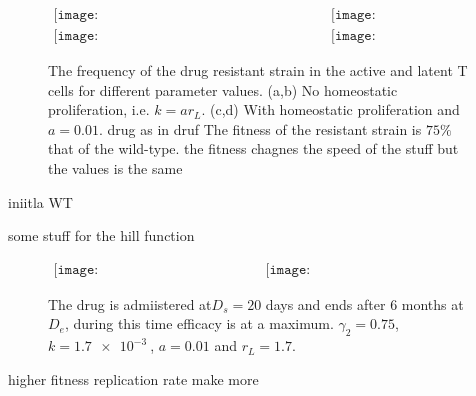 \documentclass[DIV=15]{scrartcl}
\begin{document}
 
 

\begin{figure*}[h]
 \begin{center}$
 \begin{array}{cc}
 \texttt{[image: NoHomeo\_Active\_S1\_HigFit075\_09\_06b.png]} &
 \texttt{[image: NoHomeo\_Reservoir\_S1\_HigFit075\_09\_06b.png]} \\
  \texttt{[image: Homeo\_Active\_S1\_HigFit075\_09\_06b.png]} &
 \texttt{[image: Homeo\_Reservoir\_S1\_HigFit075\_09\_06b.png]}
 \end{array}$
 \end{center}
 \caption{The frequency of the drug resistant strain in the active and latent T cells for different parameter values. (a,b) No homeostatic proliferation, i.e. $k = ar_L$. (c,d) With homeostatic proliferation and $a = 0.01$.  drug as in druf 
 The fitness of the resistant strain is $75\%$ that of the wild-type. the fitness chagnes  the speed  of the stuff but the values is the same  }
 \label{within host parameter sweep}
 \end{figure*}
 
 
 iniitla WT

some stuff for the hill function~\cite{shirreff2011}
~\cite{hollingsworth2008}


\begin{figure*}[h]
 \begin{center}$
 \begin{array}{cc}
 \texttt{[image: InHostActDLabel\_17-06a.eps]} &
 \texttt{[image: InHostResDLabel\_17-06a.eps]} 
 \end{array}$
 \end{center}
 \caption{The drug is admiistered at$D_s = 20$ days and ends after $6$ months at $D_e$, during this time efficacy is at a maximum. $\gamma_2=0.75$, $k=\SI{1.7e-3}{}$, $a = 0.01$ and $r_L = 1.7$.  }
 \label{within host example}
 \end{figure*}

higher fitness replication rate make more   
  
  

  
  
\end{document}

